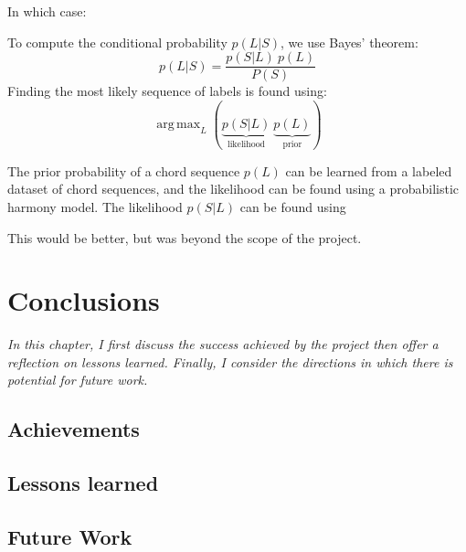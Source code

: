 \documentclass[12pt,a4paper,twoside,openright]{report}
\DeclareMathOperator*{\argmax}{arg\,max}
\theoremstyle{definition}
\begin{document}
In which case:

To compute the conditional probability $p(L|S)$, we use Bayes' theorem:
\begin{equation}
  p(L|S) = \frac{p(S|L)~p(L)}{P(S)}
  \label{eq:lgivenS}
\end{equation}
Finding the most likely sequence of labels is found using:
\begin{equation}
  \argmax_L \left(\underbrace{p(S|L)}_{\text{likelihood}}~\underbrace{p(L)}_{\text{prior}}\right)
  \label{eq:lgivenSBayes}
\end{equation}

The prior probability of a chord sequence $p(L)$ can be learned from a labeled dataset of chord sequences, and the likelihood can be found using a probabilistic harmony model. The likelihood $p(S|L)$ can be found using 

This would be better, but was beyond the scope of the project.


\chapter{Conclusions}
\textit{In this chapter, I first discuss the success achieved by the project then offer a reflection on lessons learned. Finally, I consider the directions in which there is potential for future work.}
\section{Achievements}

\section{Lessons learned}

\section{Future Work}




\nocite{*}
% 

\end{document}
